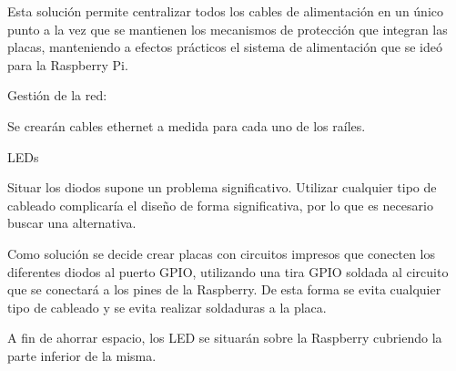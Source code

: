 Esta solución permite centralizar todos los cables de alimentación en un único punto a la vez que se mantienen los mecanismos de protección que integran las placas, manteniendo a efectos prácticos el sistema de alimentación que se ideó para la Raspberry Pi.

Gestión de la red:

Se crearán cables ethernet a medida para cada uno de los raíles.

LEDs

Situar los diodos supone un problema significativo. Utilizar cualquier tipo de cableado complicaría el diseño de forma significativa, por lo que es necesario buscar una alternativa.

Como solución se decide crear placas con circuitos impresos que conecten los diferentes diodos al puerto GPIO, utilizando una tira GPIO soldada al circuito que se conectará a los pines de la Raspberry. De esta forma se evita cualquier tipo de cableado y se evita realizar soldaduras a la placa.

A fin de ahorrar espacio, los LED se situarán sobre la Raspberry cubriendo la parte inferior de la misma.